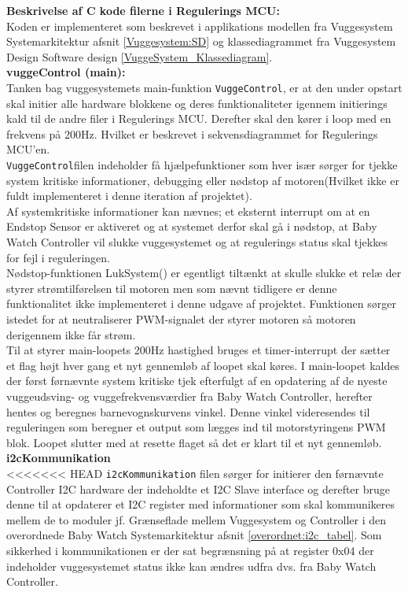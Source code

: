 \textbf{Beskrivelse af C kode filerne i Regulerings MCU:} \\
Koden er implementeret som beskrevet i applikations modellen fra Vuggesystem Systemarkitektur afsnit \vref{Vuggesystem:SD} og klassediagrammet fra Vuggesystem Design Software design \vref{VuggeSystem_Klassediagram}. \\
\textbf{vuggeControl (main):} \\
Tanken bag vuggesystemets main-funktion \verb+VuggeControl+, er at den under opstart skal initier alle hardware blokkene og deres funktionaliteter igennem initierings kald til de andre  filer i Regulerings MCU. Derefter skal den kører i loop med en frekvens på 200Hz. Hvilket er beskrevet i sekvensdiagrammet for Regulerings MCU'en. \\ \verb+VuggeControl+filen indeholder få hjælpefunktioner som hver især sørger for tjekke system kritiske informationer, debugging eller nødstop af motoren(Hvilket ikke er fuldt implementeret i denne iteration af projektet). \\Af systemkritiske informationer kan nævnes; et eksternt interrupt om at en Endstop Sensor er aktiveret og at systemet derfor skal gå i nødstop, at Baby Watch Controller vil slukke vuggesystemet og at regulerings status skal tjekkes for fejl i reguleringen.\\ Nødstop-funktionen LukSystem() er egentligt tiltænkt at skulle slukke et relæ der styrer strømtilførelsen til motoren men som nævnt tidligere er denne funktionalitet ikke implementeret i denne udgave af projektet. Funktionen sørger istedet for at neutraliserer PWM-signalet der styrer motoren så motoren derigennem ikke får strøm. \\ Til at styrer main-loopets 200Hz hastighed bruges et timer-interrupt der sætter et flag højt hver gang et nyt gennemløb af loopet skal køres. I main-loopet kaldes der først førnævnte system kritiske tjek efterfulgt af en opdatering af de nyeste vuggeudsving- og vuggefrekvensværdier fra Baby Watch Controller, herefter hentes og beregnes barnevognskurvens vinkel. Denne vinkel videresendes til reguleringen som beregner et output som lægges ind til motorstyringens PWM blok. Loopet slutter med at resette flaget så det er klart til et nyt gennemløb. \\
\textbf{i2cKommunikation} \\ 
<<<<<<< HEAD
\verb+i2cKommunikation+ filen sørger for initierer den førnævnte Controller I2C hardware der indeholdte et I2C Slave interface og derefter bruge denne til at opdaterer et I2C register med informationer som skal kommunikeres mellem de to moduler jf. Grænseflade mellem Vuggesystem og Controller i den overordnede Baby Watch Systemarkitektur afsnit \vref{overordnet:i2c_tabel}. Som sikkerhed i kommunikationen er der sat begrænsning på at register 0x04 der indeholder vuggesystemet status ikke kan ændres udfra dvs. fra Baby Watch Controller.
